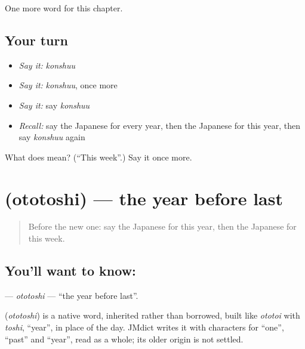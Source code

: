 \begin{grammarlens}[title={What you've built}]
One more word for this chapter.
\end{grammarlens}

\subsection*{Your turn}
\begin{itemize}
\raggedright
  \item \emph{Say it:} \emph{konshuu}
  \item \emph{Say it:} \emph{konshuu}, once more
  \item \emph{Say it:} say \emph{konshuu}
  \item \emph{Recall:} say the Japanese for every year, then the Japanese for this year, then say \emph{konshuu} again
\end{itemize}

\begin{tcolorbox}[breakable,colback=teal!4,colframe=teal!35!black,title={Before you move on}]
What does  mean? (\textquotedblleft{}This week\textquotedblright{}.) Say it once more.
\end{tcolorbox}
\section[\texorpdfstring{\ja{おととし} (ototoshi)}{おととし (ototoshi)}]{ (ototoshi) — the year before last}

\label{lesson:JA-C75-ototoshi}



\begin{quote}
Before the new one: say the Japanese for this year, then the Japanese for this week.
\end{quote}

\subsection*{You'll want to know: }
\textbf{} — \emph{ototoshi} — \textquotedblleft{}the year before last\textquotedblright{}.

\begin{cousinweb}
\textbf{} (\emph{ototoshi}) is a native word, inherited rather than borrowed, built like \emph{ototoi} with \emph{toshi}, \textquotedblleft{}year\textquotedblright{}, in place of the day. JMdict writes it with characters for \textquotedblleft{}one\textquotedblright{}, \textquotedblleft{}past\textquotedblright{} and \textquotedblleft{}year\textquotedblright{}, read as a whole; its older origin is not settled.
\end{cousinweb}

